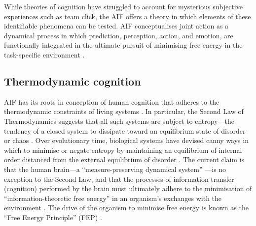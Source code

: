 \begin{CJK}{UTF8}{gbsn}
While theories of cognition have struggled to account for mysterious subjective experiences such as team click, the AIF offers a theory in which elements of these identifiable phenomena can be tested.  AIF conceptualises joint action as a dynamical process in which prediction, perception, action, and emotion, are functionally integrated in the ultimate pursuit of minimising free energy in the task-specific environment \citep{Clark2015}.


\subsection{Thermodynamic cognition\label{sect:thermoCog}}
AIF has its roots in conception of human cognition that adheres to the thermodynamic constraints of living systems \citep{Yufik2017}.  In particular, the Second Law of Thermodynamics suggests that all such systems are subject to entropy---the tendency of a closed system to dissipate toward an equilibrium state of disorder or chaos \citep{Wolfram2002}.  Over evolutionary time, biological systems have devised canny ways in which to minimise or negate entropy by maintaining an equilibrium of internal order distanced from the external equilibrium of disorder \citep{Schrodinger1944}.  The current claim is that the human brain---a ``measure-preserving dynamical system'' \citep[c.f.][]{Friston2013}---is no exception to the Second Law, and that the processes of information transfer (cognition) performed by the brain must ultimately adhere to the minimisation of ``information-theoretic free energy'' in an organism's exchanges with the environment \citep[entropy can be understood as the average quantity of free energy to which an organism is subject][]{Yufik2002,Yufik2013,Friston2010,Sengupta2013,Sengupta2016,Sengupta2017}. The drive of the organism to minimise free energy is known as the ``Free Energy Principle'' (FEP) \citep[see][]{Friston2010}.


\end{CJK}
